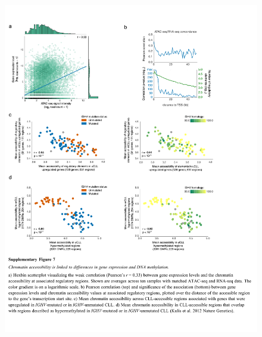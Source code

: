 \documentclass[10pt,]{article}
\begin{document}
\begin{figure}
\centering
\includegraphics[width=1.000\hsize]{figures/Supplementary_Information_07.pdf}
\end{figure}
\clearpage
\end{document}
